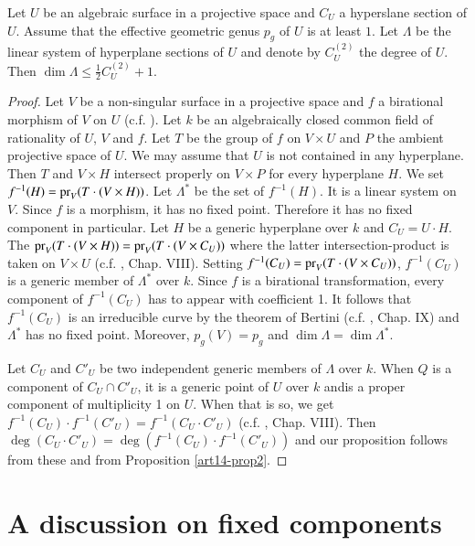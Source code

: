 \begin{proposition}\label{art14-prop3}
Let $U$ be an algebraic surface in a projective space and $C_{U}$ a hyperslane section of $U$. Assume that the effective geometric genus $p_{g}$ of $U$ is at least $1$. Let $\Lambda$ be the linear system of hyperplane sections of $U$ and denote by $C^{(2)}_{U}$ the degree of $U$. Then $\dim \Lambda \leq \frac{1}{2}C^{(2)}_{U}+1$.
\end{proposition}

\begin{proof}
Let $V$ be a non-singular surface in a projective space and $f$ a birational morphism of $V$ on $U$ (c.f. \cite{art14-key34}). Let $k$ be an algebraically closed common field of rationality of $U$, $V$ and $f$. Let $T$ be the group of $f$ on $V\times U$ and $P$ the ambient projective space of $U$. We may assume that $U$ is not contained in any hyperplane. Then $T$ and $V\times H$ intersect properly on $V\times P$ for every hyperplane $H$. We set $f^{-1}(H)=\operatorname{\mathrm{pr}}_{V}(T\cdot (V\times H))$. Let $\Lambda^{*}$ be the set of $f^{-1}(H)$. It is a linear system on $V$. Since $f$ is a morphism, it has no fixed point. Therefore it has no fixed component in particular. Let $H$ be a generic hyperplane over $k$ and $C_{U}=U\cdot H$. The $\operatorname{\mathrm{pr}}_{V}(T\cdot (V\times H))=\operatorname{\mathrm{pr}}_{V}(T\cdot (V\times C_{U}))$ where the latter intersection-product is taken on $V\times U$ (c.f. \cite{art14-key25}, Chap. VIII). Setting $f^{-1}(C_{U})=\operatorname{\mathrm{pr}}_{V}(T\cdot (V\times C_{U}))$, $f^{-1}(C_{U})$ is a generic member of $\Lambda^{*}$ over $k$. Since $f$ is a birational transformation, every component of $f^{-1}(C_{U})$ has to appear with coefficient 1. It follows that $f^{-1}(C_{U})$ is an irreducible curve by the theorem of Bertini (c.f. \cite{art14-key25}, Chap. IX) and $\Lambda^{*}$ has no fixed point. Moreover, $p_{g}(V)=p_{g}$ and $\dim \Lambda = \dim \Lambda^{*}$.

Let $C_{U}$ and $C'_{U}$ be two independent generic members of $\Lambda$ over $k$. When $Q$ is a component of $C_{U}\cap C'_{U}$, it is a generic point of $U$ over $k$ and\pageoriginale is a proper component of multiplicity 1 on $U$. When that is so, we get $f^{-1}(C_{U})\cdot f^{-1}(C'_{U})=f^{-1}(C_{U}\cdot C'_{U})$ (c.f. \cite{art14-key25}, Chap. VIII). Then $\deg (C_{U}\cdot C'_{U})=\deg (f^{-1}(C_{U})\cdot f^{-1}(C'_{U}))$ and our proposition follows from these and from Proposition \ref{art14-prop2}.
\end{proof}

\section{A discussion on fixed components}\label{art14-sec3}

